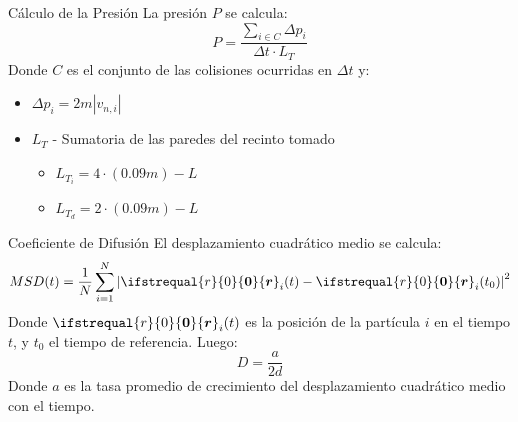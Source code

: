 \documentclass{beamer}
\renewcommand\vec[1]{\ifstrequal{#1}{0}{\ensuremath{\mathbf{0}}}{\ensuremath{\boldsymbol{#1}}}}
\begin{document}
\begin{frame}{Cálculo de la Presión}
    La presión $P$ se calcula:
    \begin{equation*}
        P=\frac{\sum_{i\in C}\Delta p_i}{\Delta t \cdot L_T}
    \end{equation*}
    Donde $C$ es el conjunto de las colisiones ocurridas en $\Delta t$ y:
    \begin{itemize}
        \item $\Delta p_i=2m|v_{n,i}|$
        \item $L_T$ - Sumatoria de las paredes del recinto tomado
        \begin{itemize}
            \item $L_{T_i}=4\cdot(0.09m)-L$
            \item $L_{T_d}=2\cdot(0.09m)-L$
        \end{itemize}
    \end{itemize}
\end{frame}

\begin{frame}{Coeficiente de Difusión}
    El desplazamiento cuadrático medio se calcula:
    \begin{equation*}
        MSD(t)=\frac{1}{N}\sum_{i=1}^{N} \left| \vec{r}_i(t) - \vec{r}_i(t_0) \right|^2
    \end{equation*}
    Donde $\vec{r}_i(t)$ es la posición de la partícula $i$ en el tiempo $t$, y $t_0$ el tiempo de referencia. Luego:
    \begin{equation*}
        D=\frac{a}{2d}
    \end{equation*}
    Donde $a$ es la tasa promedio de crecimiento del desplazamiento cuadrático medio con el tiempo.
\end{frame}

\end{document}
